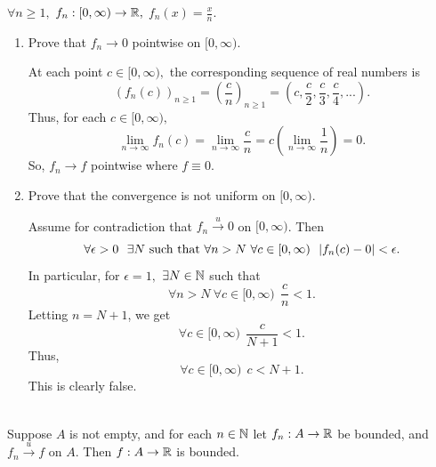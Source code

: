 \begin{example}
    $\forall n \geq 1,$ $f_n:[0,\infty) \to \mathbb{R},$ $f_n(x) = \frac{x}{n}.$
    \begin{enumerate}
        \item Prove that $f_n \to 0$ pointwise on $[0, \infty)$.
        
        At each point $c \in [0, \infty),$ the corresponding sequence of real numbers is 
        $$(f_n(c))_{n\geq 1} = \left(\frac{c}{n}\right)_{n\geq 1} = \left(c, \frac{c}{2}, \frac{c}{3}, \frac{c}{4}, ...\right).$$
        Thus, for each $c \in [0, \infty),$
        $$\lim_{n\to \infty}f_n(c) = \lim_{n \to \infty}\frac{c}{n} = c \left(\lim_{n\to \infty}\frac{1}{n}\right) = 0.$$
        So, $f_n \to f$ pointwise where $f \equiv 0.$

        \item Prove that the convergence is not uniform on $[0, \infty)$.
        
        Assume for contradiction that $f_n \overset{u}{\to}0$ on $[0,\infty)$. Then
        $$\forall \epsilon > 0 ~~\exists N \text{ such that } \forall n > N ~\forall c \in [0,\infty) ~~|f_n(c) - 0| < \epsilon.$$
        In particular, for $\epsilon = 1,$ $\exists N \in \mathbb{N}$ such that
        $$\forall n > N ~\forall c \in [0, \infty) ~~\frac{c}{n} < 1.$$
        Letting $n = N+1$, we get
        $$\forall c \in [0,\infty) ~~\frac{c}{N+1} < 1.$$
        Thus,
        $$\forall c \in [0,\infty) ~~c < N+1.$$
        This is clearly false.
    \end{enumerate}
\end{example}

\begin{theorem} \leavevmode \\
    \label{Thm7.1}
    Suppose $A$ is not empty, and for each $n \in \mathbb{N}$ let $f_n: A \to \mathbb{R}$ be bounded, and $f_n \overset{u}{\to}f$ on $A$. Then $f:A \to \mathbb{R}$ is bounded.
\end{theorem}

